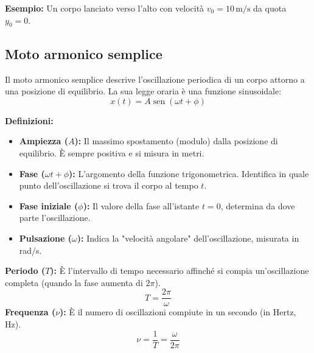 \documentclass[12pt]{article}
\begin{document}
\textbf{Esempio:} Un corpo lanciato verso l'alto con velocità $v_0 = 10 \, \text{m/s}$ da quota $y_0 = 0$.
\begin{center}
\quad
{}
\end{center}

\subsection*{Moto armonico semplice}
Il moto armonico semplice descrive l'oscillazione periodica di un corpo attorno a una posizione di equilibrio. La sua legge oraria è una funzione sinusoidale: %
\begin{equation}
x(t) = A \operatorname{sen}(\omega t + \phi) \tag{1.11}
\end{equation}

\textbf{Definizioni:}
\begin{itemize}
    \item \textbf{Ampiezza ($A$):} Il massimo spostamento (modulo) dalla posizione di equilibrio. È sempre positiva e si misura in metri.
    \item \textbf{Fase ($\omega t + \phi$):} L'argomento della funzione trigonometrica. Identifica in quale punto dell'oscillazione si trova il corpo al tempo $t$.
    \item \textbf{Fase iniziale ($\phi$):} Il valore della fase all'istante $t=0$, determina da dove parte l'oscillazione.
    \item \textbf{Pulsazione ($\omega$):} Indica la "velocità angolare" dell'oscillazione, misurata in rad/s.
\end{itemize}

\textbf{Periodo ($T$):} È l'intervallo di tempo necessario affinché si compia un'oscillazione completa (quando la fase aumenta di $2\pi$).
\begin{equation}
T = \frac{2\pi}{\omega}
\end{equation}
\textbf{Frequenza ($\nu$):} È il numero di oscillazioni compiute in un secondo (in Hertz, Hz). %
\begin{equation}
\nu = \frac{1}{T} = \frac{\omega}{2\pi}
\end{equation}
\end{document}
